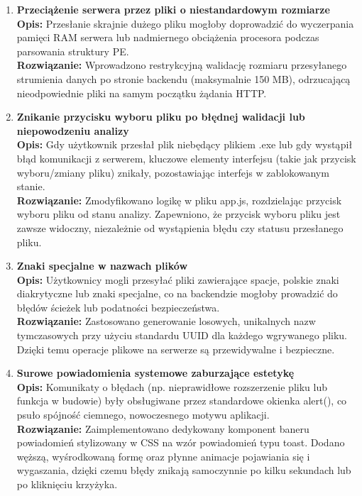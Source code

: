 \documentclass{article}
\begin{document}
\begin{enumerate}
\item \textbf{Przeciążenie serwera przez pliki o niestandardowym rozmiarze}\\
\textbf{Opis:} Przesłanie skrajnie dużego pliku mogłoby doprowadzić do wyczerpania pamięci RAM serwera lub nadmiernego obciążenia procesora podczas parsowania struktury PE.\\
\textbf{Rozwiązanie:} Wprowadzono restrykcyjną walidację rozmiaru przesyłanego strumienia danych po stronie backendu (maksymalnie 150 MB), odrzucającą nieodpowiednie pliki na samym początku żądania HTTP.

\item \textbf{Znikanie przycisku wyboru pliku po błędnej walidacji lub niepowodzeniu analizy} \\
\textbf{Opis:} Gdy użytkownik przesłał plik niebędący plikiem .exe lub gdy wystąpił błąd komunikacji z serwerem, kluczowe elementy interfejsu (takie jak przycisk wyboru/zmiany pliku) znikały, pozostawiając interfejs w zablokowanym stanie.\\
\textbf{Rozwiązanie:} Zmodyfikowano logikę w pliku app.js, rozdzielając przycisk wyboru pliku od stanu analizy. Zapewniono, że przycisk wyboru pliku jest zawsze widoczny, niezależnie od wystąpienia błędu czy statusu przesłanego pliku.

\item \textbf{Znaki specjalne w nazwach plików}\\
\textbf{Opis:} Użytkownicy mogli przesyłać pliki zawierające spacje, polskie znaki diakrytyczne lub znaki specjalne, co na backendzie mogłoby prowadzić do błędów ścieżek lub podatności bezpieczeństwa.\\
\textbf{Rozwiązanie:} Zastosowano generowanie losowych, unikalnych nazw tymczasowych przy użyciu standardu UUID dla każdego wgrywanego pliku. Dzięki temu operacje plikowe na serwerze są przewidywalne i bezpieczne.

\item \textbf{Surowe powiadomienia systemowe zaburzające estetykę}\\
\textbf{Opis:} Komunikaty o błędach (np. nieprawidłowe rozszerzenie pliku lub funkcja w budowie) były obsługiwane przez standardowe okienka alert(), co psuło spójność ciemnego, nowoczesnego motywu aplikacji.\\
\textbf{Rozwiązanie:} Zaimplementowano dedykowany komponent baneru powiadomień  stylizowany w CSS na wzór powiadomień typu toast. Dodano węższą, wyśrodkowaną formę oraz płynne animacje pojawiania się i wygaszania, dzięki czemu błędy znikają samoczynnie po kilku sekundach lub po kliknięciu krzyżyka.
\end{enumerate}
\end{document}
